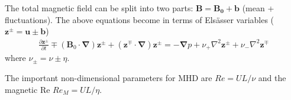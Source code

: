 The total magnetic field can be split into two parts: \( \mathbf{B} = \mathbf{B_0} + \mathbf{b} \) (mean + fluctuations). The above equations become in terms of Els\"asser variables (\(\mathbf{z}^{\pm} =  \mathbf{u} \pm \mathbf{b} \)) 
\begin{eqnarray}
\frac{\partial {\mathbf{z}^{\pm}}}{\partial t}\mp\left(\mathbf {B}_0\cdot{\mathbf \nabla}\right){\mathbf z^{\pm}} + \left({\mathbf z^{\mp}}\cdot{\mathbf \nabla}\right){\mathbf z^{\pm}} = -{\mathbf \nabla}p 
+ \nu_+ \nabla^2 \mathbf{z}^{\pm} + \nu_- \nabla^2 \mathbf{z}^{\mp} 
\end{eqnarray}
where \( \nu_\pm = \nu \pm \eta \).

The important non-dimensional parameters for MHD are \(Re = U L /\nu \) and the magnetic Re \( Re_M = U L /\eta \).
